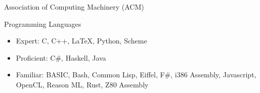 \documentclass[11pt]{letter}
\begin{document}

Association of Computing Machinery (ACM) \\


Programming Languages
\begin{itemize}
\item Expert: C, C++, LaTeX, Python, Scheme
\item Proficient: C\#, Haskell, Java
\item Familiar: BASIC, Bash, Common Lisp, Eiffel, F\#, i386 Assembly, Javascript,
  OpenCL, Reason ML, Rust, Z80 Assembly
\end{itemize}
\end{document}
